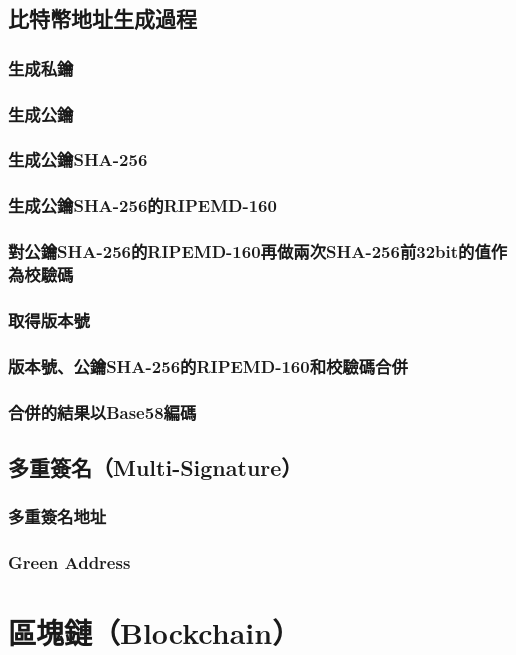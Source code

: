 		\subsection{比特幣地址生成過程}
			\subsubsection{生成私鑰}
			\subsubsection{生成公鑰}
			\subsubsection{生成公鑰SHA-256}
			\subsubsection{生成公鑰SHA-256的RIPEMD-160}
			\subsubsection{對公鑰SHA-256的RIPEMD-160再做兩次SHA-256前32bit的值作為校驗碼}
			\subsubsection{取得版本號}
			\subsubsection{版本號、公鑰SHA-256的RIPEMD-160和校驗碼合併}
			\subsubsection{合併的結果以Base58編碼}

		\subsection{多重簽名（Multi-Signature）}
			\subsubsection{多重簽名地址}
			\subsubsection{Green Address}

	\section{區塊鏈（Blockchain）}
